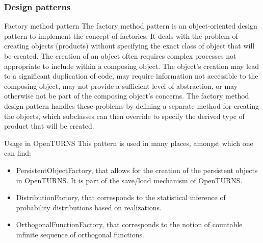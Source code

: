 \documentclass[8pt]{beamer}
\begin{document}
\begin{frame}
  \frametitle{Design patterns}
  \begin{block}{Factory method pattern}
    The \alert{factory method pattern} is an object-oriented design pattern to implement the concept of factories. It deals with the problem of creating objects (products) without specifying the exact class of object that will be created. The creation of an object often requires complex processes not appropriate to include within a composing object. The object's creation may lead to a significant duplication of code, may require information not accessible to the composing object, may not provide a sufficient level of abstraction, or may otherwise not be part of the composing object's concerns. The factory method design pattern handles these problems by defining a separate method for creating the objects, which subclasses can then override to specify the derived type of product that will be created.
  \end{block}
  \begin{block}{Usage in OpenTURNS}
    This pattern is used in many places, amongst which one can find:
    \begin{itemize}
    \item \alert{PersistentObjectFactory}, that allows for the creation of the persistent objects in OpenTURNS. It is part of the save/load mechanism of OpenTURNS.
    \item \alert{DistributionFactory}, that corresponds to the statistical inference of probability distributions based on realizations.
    \item \alert{OrthogonalFunctionFactory}, that corresponds to the notion of countable infinite sequence of orthogonal functions.
    \end{itemize}
  \end{block}
\end{frame}
\end{document}
